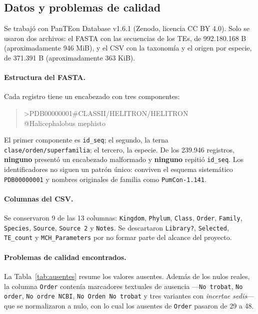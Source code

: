 \documentclass[journal]{IEEEtran}
\begin{document}
\subsection{Datos y problemas de calidad}
Se trabajó con PanTEon Database v1.6.1 (Zenodo, licencia CC BY 4.0). Solo se usaron dos
archivos: el FASTA con las secuencias de los TEs, de 992.180.168 B (aproximadamente
946 MiB), y el CSV con la taxonomía y el origen por especie, de 371.391 B
(aproximadamente 363 KiB).

\paragraph*{Estructura del FASTA.}
Cada registro tiene un encabezado con tres componentes:
\begin{quote}
\ttfamily\small
>PDB00000001\#CLASSII/HELITRON/HELITRON\\
@Halicephalobus mephisto
\end{quote}
El primer componente es \texttt{id\_seq}; el segundo, la terna
\texttt{clase/orden/superfamilia}; el tercero, la especie. De los 239.946 registros,
\textbf{ninguno} presentó un encabezado malformado y \textbf{ninguno} repitió
\texttt{id\_seq}. Los identificadores no siguen un patrón único: conviven el esquema
sistemático \texttt{PDB00000001} y nombres originales de familia como
\texttt{PumCon-1.141}.

\paragraph*{Columnas del CSV.}
Se conservaron 9 de las 13 columnas: \texttt{Kingdom}, \texttt{Phylum}, \texttt{Class},
\texttt{Order}, \texttt{Family}, \texttt{Species}, \texttt{Source}, \texttt{Source 2} y
\texttt{Notes}. Se descartaron \texttt{Library?}, \texttt{Selected}, \texttt{TE\_count} y
\texttt{MCH\_Parameters} por no formar parte del alcance del proyecto.

\paragraph*{Problemas de calidad encontrados.}
La Tabla~\ref{tab:ausentes} resume los valores ausentes. Además de los nulos reales, la
columna \texttt{Order} contenía marcadores textuales de ausencia ---\texttt{No trobat},
\texttt{No order}, \texttt{No ordre NCBI}, \texttt{No Orden No trobat} y tres variantes con
\textit{incertae sedis}--- que se normalizaron a nulo, con lo cual los ausentes de
\texttt{Order} pasaron de 29 a 48.
\end{document}

